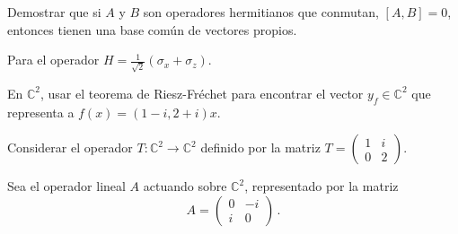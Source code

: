 \begin{questions}

  \question Demostrar que si $A$ y $B$ son operadores hermitianos que conmutan, $[A, B] = 0$, entonces tienen una base común de vectores propios.

  \question Para el operador $H = \frac{1}{\sqrt{2}}(\sigma_x + \sigma_z)$.

  \question En $\mathbb{C}^2$, usar el teorema de Riesz-Fréchet para encontrar el vector $y_f \in \mathbb{C}^2$ que representa a $f(x) = (1-i, 2+i) x$.

  \question Considerar el operador $T: \mathbb{C}^2 \to \mathbb{C}^2$ definido por la matriz $T = \begin{pmatrix} 1 & i \\ 0 & 2 \end{pmatrix}$.

  \question Sea el operador lineal $A$ actuando sobre $\mathbb{C}^2$, representado por la matriz
  \[
    A = \begin{pmatrix} 0 & -i \\ i & 0 \end{pmatrix}\,.
  \]


\end{questions}
